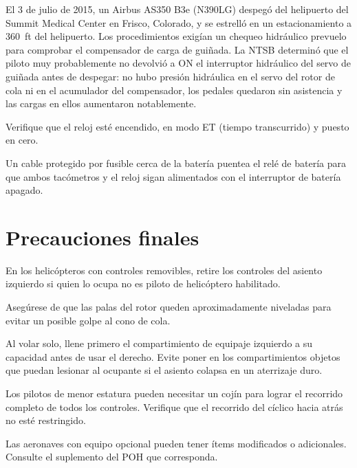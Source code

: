 \begin{caso}
El 3 de julio de 2015, un Airbus AS350 B3e (N390LG) despegó del helipuerto del Summit Medical Center en Frisco, Colorado, y se estrelló en un estacionamiento a 360~ft del helipuerto. Los procedimientos exigían un chequeo hidráulico prevuelo para comprobar el compensador de carga de guiñada. La NTSB determinó que el piloto muy probablemente no devolvió a ON el interruptor hidráulico del servo de guiñada antes de despegar: no hubo presión hidráulica en el servo del rotor de cola ni en el acumulador del compensador, los pedales quedaron sin asistencia y las cargas en ellos aumentaron notablemente.
\end{caso}

Verifique que el reloj esté encendido, en modo ET (tiempo transcurrido) y puesto en cero.

\begin{nota}
Un cable protegido por fusible cerca de la batería puentea el relé de batería para que ambos tacómetros y el reloj sigan alimentados con el interruptor de batería apagado.
\end{nota}

\section{Precauciones finales}

\begin{precaucion}
En los helicópteros con controles removibles, retire los controles del asiento izquierdo si quien lo ocupa no es piloto de helicóptero habilitado.
\end{precaucion}

\begin{precaucion}
Asegúrese de que las palas del rotor queden aproximadamente niveladas para evitar un posible golpe al cono de cola.
\end{precaucion}

\begin{precaucion}
Al volar solo, llene primero el compartimiento de equipaje izquierdo a su capacidad antes de usar el derecho. Evite poner en los compartimientos objetos que puedan lesionar al ocupante si el asiento colapsa en un aterrizaje duro.
\end{precaucion}

\begin{precaucion}
Los pilotos de menor estatura pueden necesitar un cojín para lograr el recorrido completo de todos los controles. Verifique que el recorrido del cíclico hacia atrás no esté restringido.
\end{precaucion}

\begin{nota}
Las aeronaves con equipo opcional pueden tener ítems modificados o adicionales. Consulte el suplemento del POH que corresponda.
\end{nota}
